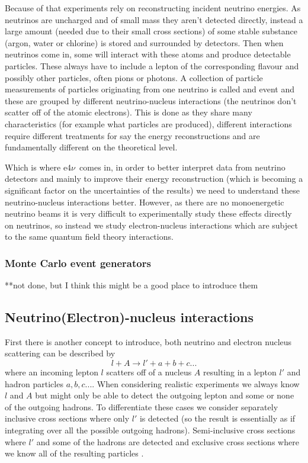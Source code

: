 \documentclass[a4paper,12pt]{article}
\newcommand{\efn}{e4$\nu$}
\begin{document}
Because of that experiments rely on reconstructing incident neutrino energies.
As neutrinos are uncharged and of small mass they aren't detected directly, instead a large amount (needed due to their small cross sections) of some stable substance (argon, water or chlorine) is stored and surrounded by detectors.
Then when neutrinos come in, some will interact with these atoms and produce detectable particles.
These always have to include a lepton of the corresponding flavour and possibly other particles, often pions or photons.
A collection of particle measurements of particles originating from one neutrino is called and event and these are grouped by different neutrino-nucleus interactions (the neutrinos don't scatter off of the atomic electrons).
This is done as they share many characteristics (for example what particles are produced), different interactions require different treatments for say the energy reconstructions and are fundamentally different on the theoretical level.

Which is where \efn\ comes in, in order to better interpret data from neutrino detectors and mainly to improve their energy reconstruction (which is becoming a significant factor on the uncertainties of the results) we need to understand these neutrino-nucleus interactions better.
However, as there are no monoenergetic neutrino beams it is very difficult to experimentally study these effects directly on neutrinos, so instead we study electron-nucleus interactions which are subject to the same quantum field theory interactions.

\subsubsection{Monte Carlo event generators}
**not done, but I think this might be a good place to introduce them


\subsection{Neutrino(Electron)-nucleus interactions}
First there is another concept to introduce, both neutrino and electron nucleus scattering can be described by
\begin{equation}
    l + A \rightarrow l' + a + b + c ...
\end{equation}
where an incoming lepton $l$ scatters off of a nucleus $A$ resulting in a lepton $l'$ and hadron particles $a, b, c ...$.
When considering realistic experiments we always know $l$ and $A$ but might only be able to detect the outgoing lepton and some or none of the outgoing hadrons. 
To differentiate these cases we consider separately inclusive cross sections where only $l'$ is detected (so the result is essentially as if integrating over all the possible outgoing hadrons).
Semi-inclusive cross sections where $l'$ and some of the hadrons are detected and exclusive cross sections where we know all of the resulting particles \cite{amaroElectronNeutrinonucleusScattering2020}.
\end{document}
